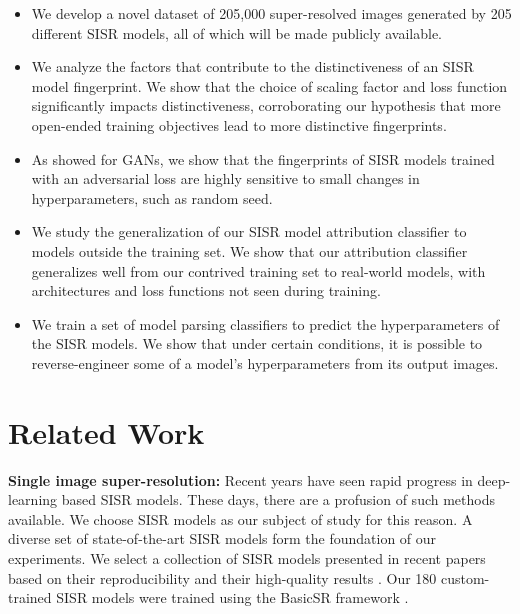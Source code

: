 \documentclass[10pt]{article} %
\begin{document}
\begin{itemize}
    \item
    We develop a novel dataset of 205,000 super-resolved images generated by 205 different SISR models, all of which will be made publicly available.

    \item 
    We analyze the factors that contribute to the distinctiveness of an SISR model fingerprint. We show that the choice of scaling factor and loss function significantly impacts distinctiveness, corroborating our hypothesis that more open-ended training objectives lead to more distinctive fingerprints.
    
    \item 
    As \cite{yu2019attributing} showed for GANs, we show that the fingerprints of SISR models trained with an adversarial loss are highly sensitive to small changes in  hyperparameters, such as random seed.

    \item
    We study the generalization of our SISR model attribution classifier to models outside the training set. We show that our attribution classifier generalizes well from our contrived training set to real-world models, with architectures and loss functions not seen during training.
    
    \item 
    We train a set of model parsing classifiers to predict the hyperparameters of the SISR models. We show that under certain conditions, it is possible to reverse-engineer some of a model's hyperparameters from its output images.

\end{itemize}

\section{Related Work}

\textbf{Single image super-resolution:} Recent years have seen rapid progress in deep-learning based SISR models. These days, there are a profusion of such methods available. We choose SISR models as our subject of study for this reason. A diverse set of state-of-the-art SISR models form the foundation of our experiments. We select a collection of SISR models presented in recent papers based on their reproducibility and their high-quality results \citep{chen2021learning,Dai_2019_CVPR,guo2020closed,kim2021noise,li2019srfbn,liang2021swinir,lim2017enhanced,Ma_2020_CVPR,Mei_2021_CVPR} \citep{sajjadi2016enhancenet,wang2021realesrgan,wang2018esrgan,Wang2018AFP,zhang2018image,zhang2018residual}. Our 180 custom-trained SISR models were trained using the BasicSR framework \citep{wang2020basicsr}.
\end{document}
